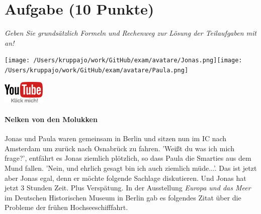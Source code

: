 \documentclass[a4paper, 9pt]{scrartcl}\usepackage[]{graphicx}\usepackage[]{xcolor}
\begin{document}
 
\clearpage

\section{Aufgabe \hfill (10 Punkte)}

\textit{Geben Sie grundsätzlich Formeln und Rechenweg zur Lösung der Teilaufgaben mit an!} \\[1Ex]
 

 
\ifcollection
\begin{flushright}
\tiny\vspace{-3Ex}
\textbf{\examinhaltstart}
\exammodulemathstat
\vspace{-4Ex}
\end{flushright}
\begin{minipage}[t]{0.5\textwidth}
\texttt{[image: /Users/kruppajo/work/GitHub/exam/avatare/Jonas.png]}\hspace{-4mm}\texttt{[image: /Users/kruppajo/work/GitHub/exam/avatare/Paula.png]}
\end{minipage}
\begin{minipage}[t]{0.5\textwidth}
\hfill
\href{https://youtu.be/1B53cVFIU7Q}{\includegraphics[width = 2cm]{img/youtube}}
\end{minipage}
\fi



\ifcollection
\paragraph{Nelken von den Molukken}
\fi



Jonas und Paula waren gemeinsam in Berlin und sitzen nun im IC nach Amsterdam um zurück nach Osnabrück zu fahren. 'Weißt du was ich mich frage?', entfährt es Jonas ziemlich plötzlich, so dass Paula die Smarties aus dem Mund fallen. 'Nein, und ehrlich gesagt bin ich auch ziemlich müde...'. Das ist jetzt aber Jonas egal, denn er möchte folgende Sachlage diskutieren. Und Jonas hat jetzt 3 Stunden Zeit. Plus Verspätung. In der Ausstellung \textit{Europa und das Meer} im Deutschen Historischen Museum in Berlin gab es folgendes Zitat über die Probleme der frühen Hochseeschifffahrt.
\end{document}
